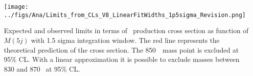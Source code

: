 \begin{frame}{}
\vspace{-.2cm}
\begin{center}
\end{center}
  \begin{center}
    \texttt{[image: ../figs/Ana/Limits\_from\_CLs\_V8\_LinearFitWidths\_1p5sigma\_Revision.png]}
  \end{center}

\vspace{-.2cm}
    \begin{block}{}
      \tiny \centering Expected and observed limits in terms of \Tp~production cross section as function of $M(5j)$ with 1.5 sigma integration window. The red line represents the theoretical prediction of the cross section. The 850~\GeVcc~mass point is excluded at 95\% CL. With a linear approximation it is possible to exclude masses between 830 and 870 \GeVcc~at 95\% CL.
    \end{block}

\end{frame}

